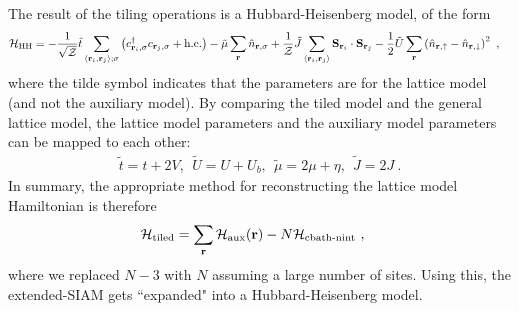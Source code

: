 \documentclass[reprint,hidelinks,onecolumn]{revtex4-2}
\begin{document}
The result of the tiling operations is a Hubbard-Heisenberg model, of the form
\begin{equation}\begin{aligned}
	\mathcal{H}_\text{HH} &= -\frac{1}{\sqrt\mathcal{Z}}\tilde t\sum_{\left<{\bf r}_i, {\bf r}_j\right>;\sigma}\left(c^\dagger_{{\bf r}_i,\sigma}c_{{\bf r}_j,\sigma} + \text{h.c.}\right) - \tilde \mu \sum_{{\bf r}}\hat n_{{\bf r},\sigma} + \frac{1}{\mathcal{Z}}\tilde J\sum_{\left< {\bf r}_i, {\bf r}_j\right>}{\bf S}_{{\bf r}_i}\cdot{\bf S}_{{\bf r}_j} - \frac{1}{2}\tilde U\sum_{\bf r}\left(\hat n_{{\bf r} , \uparrow} - \hat n_{{\bf r} , \downarrow}\right)^2  ~,
\end{aligned}\end{equation}
where the tilde symbol indicates that the parameters are for the lattice model (and not the auxiliary model). By comparing the tiled model and the general lattice model, the lattice model parameters and the auxiliary model parameters can be mapped to each other:
\begin{equation}\begin{aligned}\label{couplingsMappings}
	\tilde t = t+2V,~~ \tilde U = U + U_b, ~ ~ \tilde \mu = 2\mu + \eta,~ ~ \tilde J = 2J~.
\end{aligned}\end{equation}
In summary, the appropriate method for reconstructing the lattice model Hamiltonian is therefore
\begin{equation}\begin{aligned}\label{tilingPrescriptionFinal}
	\mathcal{H}_\text{tiled} &= \sum_{{\bf r}}\mathcal{H}_\text{aux}({\bf r}) - N\mathcal{H}_\text{cbath-nint}~,
\end{aligned}\end{equation}
where we replaced \(N-3\) with \(N\) assuming a large number of sites. Using this, the extended-SIAM gets ``expanded" into a Hubbard-Heisenberg model.
\end{document}
